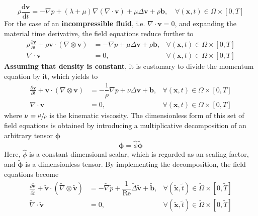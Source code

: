 \documentclass[]{scrartcl}
\newcommand{\pfrac}[2]{\frac{\partial #1}{\partial #2}}
\newcommand{\tdfrac}[2]{\frac{\mathrm{d} #1}{\mathrm{d} #2}}
\newcommand{\bs}[1]{\boldsymbol{#1}}
\begin{document}
\begin{equation*}
\rho \tdfrac{\bs{v}}{t} = -\nabla p + (\lambda + \mu) \nabla (\nabla \cdot \bs{v}) + \mu \Delta \bs{v} + \rho\bs{b}, \quad \forall (\bs{x}, t) \in \Omega \times \left[0, T \right]
\end{equation*}
For the case of an \textbf{incompressible fluid}, i.e. $\nabla \cdot \bs{v} = 0$, and expanding the material time derivative, the field equations reduce further to
\begin{equation*}
	\begin{aligned}
		\rho \pfrac{\bs{v}}{t} +  \rho \bs{v} \cdot (\nabla \otimes \bs{v})&=  -\nabla p + \mu \Delta \bs{v} + \rho \bs{b}, &\forall (\bs{x}, t) \in \Omega \times \left[0, T \right] \\
		\nabla \cdot \bs{v}&= 0, &\forall (\bs{x}, t) \in \Omega \times  \left[0, T \right]
	\end{aligned}
\end{equation*}
\textbf{Assuming that density is constant}, it is customary to divide the momentum equation by it, which yields to 
\begin{subequations}\label{Eqn:ReducedFieldEquations}
	\begin{align}
		\label{Eqn:ReducedNavierStokesLinearMommentum}
		\pfrac{\bs{v}}{t} + \bs{v} \cdot (\nabla \otimes \bs{v})&=  - \dfrac{1}{\rho}\nabla p + \nu \Delta \bs{v} + \bs{b}, &\forall (\bs{x}, t) \in \Omega \times \left[0, T \right] \\
		\label{Eqn:ReducedNavierStokesMassConservation}
		\nabla \cdot \bs{v}&= 0, &\forall (\bs{x}, t) \in \Omega \times  \left[0, T \right]
	\end{align}
\end{subequations}
where $\nu = \sfrac{\mu}{\rho}$ is the kinematic viscosity. The dimensionless form of this set of field equations is obtained by introducing a multiplicative decomposition of an arbitrary tensor $\bs{\phi}$
\begin{equation*}
	\bs{\phi} = \hat{\phi} \tilde{\bs{\phi}}
\end{equation*}
Here, $\hat{\phi}$ is a constant dimensional scalar, which is regarded as an scaling factor, and $ \tilde{\bs{\phi}}$ is a dimensionless tensor. By implementing the decomposition, the field equations become
\begin{subequations}\label{Eqn:AdimensionalReducedFieldEquations}
	\begin{align}
		\label{Eqn:DimensionlessReducedNavierStokesLinearMommentum}
		\pfrac{\bs{\tilde{v}}}{\tilde{t}} + \bs{\tilde{v}} \cdot (\tilde{\nabla} \otimes \bs{\tilde{v}})&=  -\tilde{\nabla} \tilde{p}+ \dfrac{1}{\mathrm{Re}}\tilde{\Delta} \bs{\tilde{v}} + \bs{\tilde{b}}, &\forall (\bs{\tilde{x}}, \tilde{t}) \in \tilde{\Omega} \times [0, \tilde{T} ] \\
		\label{Eqn:DimensionlessReducedNavierStokesMassConservation}
		\tilde{\nabla} \cdot \bs{\tilde{v}}&= 0, &\forall (\bs{\tilde{x}}, \tilde{t}) \in\tilde{ \Omega} \times  [0, \tilde{T} ]
	\end{align}
\end{subequations}
\end{document}
